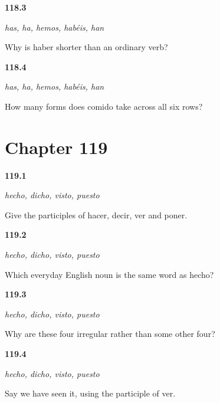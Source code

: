 \noindent\begin{minipage}[t]{\linewidth}
\raggedright
\hypertarget{review-ES-C49-haber-completo-why}{\textbf{118.3}} \emph{has, ha, hemos, habéis, han}\par
\small Why is haber shorter than an ordinary verb?
\end{minipage}\par\medskip

\noindent\begin{minipage}[t]{\linewidth}
\raggedright
\hypertarget{review-ES-C49-haber-completo-participle}{\textbf{118.4}} \emph{has, ha, hemos, habéis, han}\par
\small How many forms does comido take across all six rows?
\end{minipage}\par\medskip

\section*{Chapter 119}

\noindent\begin{minipage}[t]{\linewidth}
\raggedright
\hypertarget{review-ES-C49-participios-irregulares-four}{\textbf{119.1}} \emph{hecho, dicho, visto, puesto}\par
\small Give the participles of hacer, decir, ver and poner.
\end{minipage}\par\medskip

\noindent\begin{minipage}[t]{\linewidth}
\raggedright
\hypertarget{review-ES-C49-participios-irregulares-fact}{\textbf{119.2}} \emph{hecho, dicho, visto, puesto}\par
\small Which everyday English noun is the same word as hecho?
\end{minipage}\par\medskip

\noindent\begin{minipage}[t]{\linewidth}
\raggedright
\hypertarget{review-ES-C49-participios-irregulares-why}{\textbf{119.3}} \emph{hecho, dicho, visto, puesto}\par
\small Why are these four irregular rather than some other four?
\end{minipage}\par\medskip

\noindent\begin{minipage}[t]{\linewidth}
\raggedright
\hypertarget{review-ES-C49-participios-irregulares-use}{\textbf{119.4}} \emph{hecho, dicho, visto, puesto}\par
\small Say we have seen it, using the participle of ver.
\end{minipage}\par\medskip

